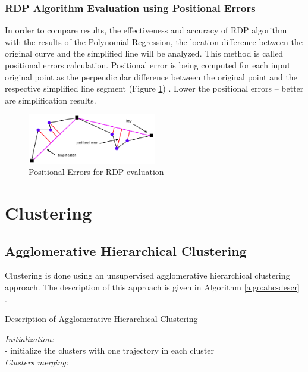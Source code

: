 \subsubsection{RDP Algorithm Evaluation using Positional Errors}

In order to compare results, the effectiveness and accuracy of RDP algorithm with the results of the Polynomial Regression, the location difference between the original curve and the simplified line will be analyzed. This method is called positional errors calculation. Positional error is being computed for each input original point as the perpendicular difference between the original point and the respective simplified line segment (Figure \ref{fig:rdp_algo_eval}) \cite{online:rdp_algo_var}. Lower the positional errors -- better are simplification results.

\begin{figure}[!htb]
	\centering{}
	\includegraphics[width=0.5\textwidth]{images/rdp-algo-eval.png}
	\caption{Positional Errors for RDP evaluation \cite{online:rdp_algo_var}}
	\label{fig:rdp_algo_eval}
\end{figure}

\section{Clustering}

\subsection{Agglomerative Hierarchical Clustering}

Clustering is done using an unsupervised agglomerative hierarchical clustering approach. The description of this approach is given in Algorithm \ref{algo:ahc-descr} \cite{inproceedings:7_related_work}.

\begin{algorithm}[!htb]
	\caption{Description of Agglomerative Hierarchical Clustering}
	\label{algo:ahc-descr}
	\SetAlgoLined
	\textit{Initialization:} \\
	- initialize the clusters with one trajectory in each cluster \\
	\textit{Clusters merging:}\\
	
\end{algorithm}

